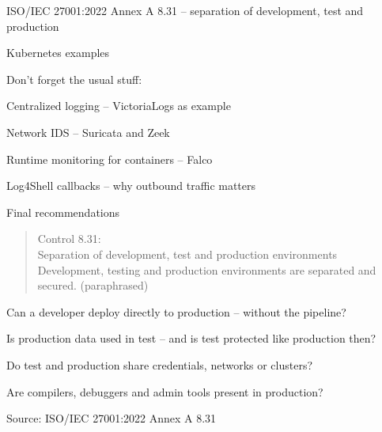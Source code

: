 \documentclass[Screen16to9,17pt]{foils}
\begin{document}

\begin{list2}
\item ISO/IEC 27001:2022 Annex A 8.31 -- separation of development, test and production
\item Kubernetes examples
\item Don't forget the usual stuff:
\begin{list2}
\item Centralized logging -- VictoriaLogs as example
\item Network IDS -- Suricata and Zeek
\item Runtime monitoring for containers -- Falco
\end{list2}
\item Log4Shell callbacks -- why outbound traffic matters
\item Final recommendations
\end{list2}



\begin{quote}
Control 8.31:\\
Separation of development, test and production environments\\
Development, testing and production environments are separated and secured. (paraphrased)
\end{quote}

\begin{list1}
\item Can a developer deploy directly to production -- without the pipeline?
\item Is production data used in test -- and is test protected like production then?
\item Do test and production share credentials, networks or clusters?
\item Are compilers, debuggers and admin tools present in production?
\end{list1}

Source: ISO/IEC 27001:2022 Annex A 8.31


\end{document}
